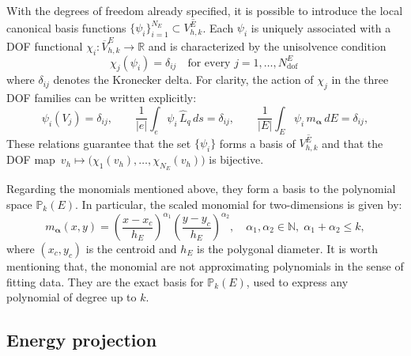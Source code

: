 \documentclass{article}
\begin{document}
With the degrees of freedom already specified, it is possible to introduce the local canonical basis functions $\{\psi_i\}_{i=1}^{N_E}\subset \overline{V_{h,k}^E}$. Each $\psi_i$ is uniquely associated with a DOF functional
$\chi_i : \overline{V}_{h,k}^E\!\longrightarrow\!\mathbb{R}$ and is characterized by the unisolvence condition
\begin{equation}
    \nonumber
    \chi_j(\psi_i)=\delta_{ij}
    \quad\text{for every } j=1,\dots,N^E_{\text{dof}}\;
\end{equation}
where $\delta_{ij}$ denotes the Kronecker delta. For clarity, the action of $\chi_j$ in the three DOF families can be written explicitly:
\begin{equation}
    \nonumber
    \psi_i(V_j)=\delta_{ij},\qquad
    \frac{1}{|e|}\int_{e}\psi_i\,\widehat L_q\,ds=\delta_{ij},\qquad
    \frac{1}{|E|}\int_{E}\psi_i\,m_{\boldsymbol\alpha}\,dE=\delta_{ij},
\end{equation}
These relations guarantee that the set $\{\psi_i\}$ forms a basis of $\overline{V_{h,k}^E}$ and that the DOF map $\,v_h\longmapsto\bigl(\chi_1(v_h),\dots,\chi_{N_E}(v_h)\bigr)$ is bijective.

Regarding the monomials mentioned above, they form a basis to the polynomial space $\mathbb{P}_k(E)$. In particular, the scaled monomial for two-dimensions is given by:
\begin{equation}
    \nonumber
    m_{\boldsymbol{\alpha}}(x,y) = \left( \frac{x-x_c}{h_E} \right)^{\alpha_1} \left( \frac{y-y_c}{h_E} \right)^{\alpha_2}, \quad \alpha_1, \alpha_2\in \mathbb{N}, \; \alpha_1 + \alpha_2 \leq k,
\end{equation}
where $(x_c, y_c)$ is the centroid and $h_E$ is the polygonal diameter. It is worth mentioning that, the monomial are not approximating polynomials in the sense of fitting data. They are the exact basis for $\mathbb{P}_k(E)$, used to express any polynomial of degree up to $k$.


\subsection{Energy projection}
\label{sec:energy_projection}
\end{document}

